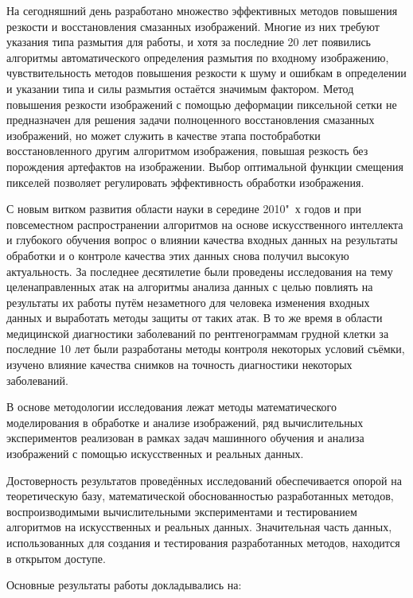 На сегодняшний день разработано множество эффективных методов повышения резкости и восстановления смазанных изображений. Многие из них требуют указания типа размытия для работы, и хотя за последние 20 лет появились алгоритмы автоматического определения размытия по входному изображению, чувствительность методов повышения резкости к шуму и ошибкам в определении и указании типа и силы размытия остаётся значимым фактором. Метод повышения резкости изображений с помощью деформации пиксельной сетки не предназначен для решения задачи полноценного восстановления смазанных изображений, но может служить в качестве этапа постобработки восстановленного другим алгоритмом изображения, повышая резкость без порождения артефактов на изображении. Выбор оптимальной функции смещения пикселей позволяет регулировать эффективность обработки изображения.

С новым витком развития области науки в середине 2010"~х годов и при повсеместном распространении алгоритмов на основе искусственного интеллекта и глубокого обучения вопрос о влиянии качества входных данных на результаты обработки и о контроле качества этих данных снова получил высокую актуальность. За последнее десятилетие были проведены исследования на тему целенаправленных атак на алгоритмы анализа данных с целью повлиять на результаты их работы путём незаметного для человека изменения входных данных и выработать методы защиты от таких атак. В то же время в области медицинской диагностики заболеваний по рентгенограммам грудной клетки за последние 10 лет были разработаны методы контроля некоторых условий съёмки, изучено влияние качества снимков на точность диагностики некоторых заболеваний.


{\methods} 

В основе методологии исследования лежат методы математического моделирования в обработке и анализе изображений, ряд вычислительных экспериментов реализован в рамках задач машинного обучения и анализа изображений с помощью искусственных и реальных данных.


{\reliability}

Достоверность результатов проведённых исследований обеспечивается опорой на теоретическую базу, математической обоснованностью разработанных методов, воспроизводимыми вычислительными экспериментами и тестированием алгоритмов на искусственных и реальных данных. Значительная часть данных, использованных для создания и тестирования разработанных методов, находится в открытом доступе.


{\probation}
Основные результаты работы докладывались на:

